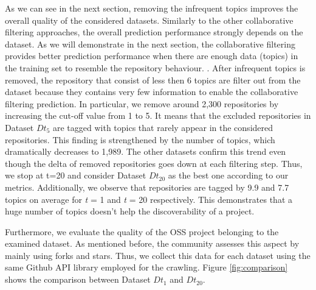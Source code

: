 As we can see in the next section, removing the infrequent topics improves the overall quality of the considered datasets. 
Similarly to the other collaborative filtering approaches, the overall prediction performance strongly depends on the dataset. As we will demonstrate in the next section, the collaborative filtering provides better prediction performance when there are enough data (\ie topics) in the training set to resemble the repository behaviour. . After infrequent topics is removed, the repository that consist of less then 6 topics are filter out from the dataset because they contains very few information to enable the collaborative filtering prediction. In particular, we remove around 2,300 repositories by increasing the cut-off value from 1 to 5. It means that the excluded repositories in Dataset $Dt_5$ are tagged with topics that rarely appear in the considered repositories. This finding is strengthened by the number of topics, which dramatically decreases to 1,989. The other datasets confirm this trend even though the delta of removed repositories goes down at each filtering step. Thus, we stop at t=20 and consider Dataset $Dt_{20}$ as the best one according to our metrics. Additionally, we observe that repositories are tagged by 9.9 and 7.7 topics on average for \emph{t} = 1 and \emph{t} = 20 respectively. This demonstrates that a huge number of topics doesn't help the discoverability of a project. 


Furthermore, we evaluate the quality of the OSS project belonging to the examined dataset. As mentioned before, the \GH community assesses this aspect by mainly using forks and stars. Thus, we collect this data for each dataset using the same Github API library employed for the crawling. Figure \ref{fig:comparison} shows the comparison between Dataset $Dt_1$ and $Dt_20$. 



